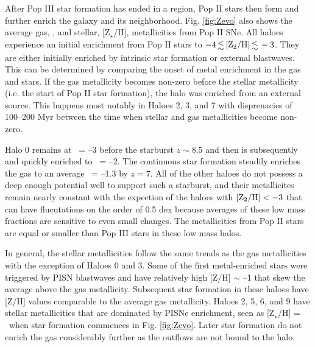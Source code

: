 \documentclass[useAMS,usenatbib]{mn2e}
\begin{document}
After Pop III star formation has ended in a region, Pop II stars then
form and further enrich the galaxy and its neighborhood.
Fig. \ref{fig:Zevo} also shows the average gas, \ztwo, and stellar,
[Z$_\star$/H], metallicities from Pop II SNe.  All haloes experience
an initial enrichment from Pop II stars to $-4 \la \ztwo \la -3$.
They are either initially enriched by intrinsic star formation or
external blastwaves.  This can be determined by comparing the onset of
metal enrichment in the gas and stars.  If the gas metallicity becomes
non-zero before the stellar metallicity (i.e. the start of Pop II star
formation), the halo was enriched from an external source.  This
happens most notably in Haloes 2, 3, and 7 with disprenacies of
100--200 Myr between the time when stellar and gas metallicities
become non-zero.

Halo 0 remains at \ztwo~= --3 before the starburst $z \sim 8.5$ and
then is subsequently and quickly enriched to \ztwo~= --2.  The
continuous star formation steadily enriches the gas to an average
\ztwo~= --1.3 by $z=7$.  All of the other haloes do not possess a deep
enough potential well to support such a starburst, and their
metallicites remain nearly constant with the expection of the haloes
with $\ztwo < -3$ that can have flucutations on the order of 0.5 dex
because averages of these low mass fractions are sensitive to even
small changes.  The metallicities from Pop II stars are equal or
smaller than Pop III stars in these low mass halos.

In general, the stellar metallicities follow the same trends as the
gas metallicities with the exception of Haloes 0 and 3.  Some of the
first metal-enriched stars were triggered by PISN blastwaves and have
relatively high [Z/H] $\sim$ --1 that skew the average above the gas
metallicity.  Subsequent star formation in these haloes have [Z/H]
values comparable to the average gas metallicity.  Haloes 2, 5, 6, and
9 have stellar metallicities that are dominated by PISNe enrichment,
seen as [Z$_\star$/H] = \zthree~when star formation commences in
Fig. \ref{fig:Zevo}.  Later star formation do not enrich the gas
considerably further as the outflows are not bound to the halo.
\end{document}
